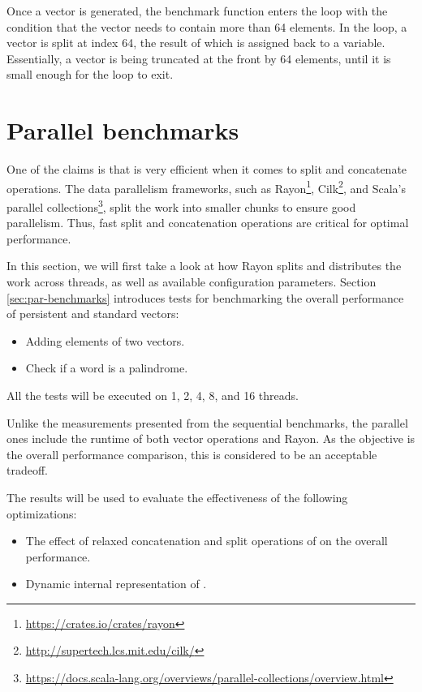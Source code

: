 Once a vector is generated, the benchmark function enters the loop with the condition that the vector needs to contain more than 64 elements. In the loop, a vector is split at index 64, the result of which is assigned back to a variable. Essentially, a vector is being truncated at the front by 64 elements, until it is small enough for the loop to exit.

\section{Parallel benchmarks}
One of the claims is that \rrbvec{} is very efficient when it comes to split and concatenate operations. The data parallelism frameworks, such as Rayon\footnote{\url{https://crates.io/crates/rayon}}, Cilk\footnote{\url{http://supertech.lcs.mit.edu/cilk/}}, and Scala's parallel collections\footnote{\url{https://docs.scala-lang.org/overviews/parallel-collections/overview.html}}, split the work into smaller chunks to ensure good parallelism. Thus, fast split and concatenation operations are critical for optimal performance.

In this section, we will first take a look at how Rayon splits and distributes the work across threads, as well as available configuration parameters. Section \ref{sec:par-benchmarks} introduces tests for benchmarking the overall performance of persistent and standard vectors:

\begin{itemize}
    \item Adding elements of two vectors.
    \item Check if a word is a palindrome.
\end{itemize}

All the tests will be executed on 1, 2, 4, 8, and 16 threads.

Unlike the measurements presented from the sequential benchmarks, the parallel ones include the runtime of both vector operations and Rayon. As the objective is the overall performance comparison, this is considered to be an acceptable tradeoff.

The results will be used to evaluate the effectiveness of the following optimizations:
\begin{itemize}
    \item The effect of relaxed concatenation and split operations of \rrbvec{} on the overall performance.
    \item Dynamic internal representation of \pvec{}.
\end{itemize}

